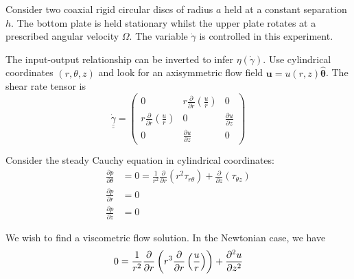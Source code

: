 \documentclass{jknotes}
\newcommand{\dunder}[1]{\underline{\underline{#1}}}
\newcommand{\srate}{\dot{\gamma}}
\begin{document}
Consider two coaxial rigid circular discs of radius $a$ held at a constant separation
$h$. The bottom plate is held stationary whilst the upper plate rotates at a
prescribed angular velocity $\Omega$. The variable $\srate$ is controlled in
this experiment.

\begin{center}
\end{center}

The input-output relationship can be inverted to infer $\eta(\srate)$. Use
cylindrical coordinates $(r, \theta, z)$ and look for an axisymmetric flow
field $\bm{u} = u(r,z) \hat{\bm{\theta}}$. The shear rate tensor is
\begin{equation}
	\dunder{\srate} = \begin{pmatrix} 0 & r\frac{\partial}{\partial r} \left(
		\frac{u}{r}\right) & 0 \\ r\frac{\partial}{\partial r} \left(
	\frac{u}{r}\right) & 0 & \frac{\partial u}{\partial z} \\
0 & \frac{\partial u}{\partial z} & 0 \end{pmatrix}
\end{equation}

Consider the steady Cauchy equation in cylindrical coordinates:
\begin{align}
	\frac{\partial p}{\partial \theta} &= 0 = \frac{1}{r^2} \frac{\partial
		}{\partial r} \left( r^2 \tau_{r\theta}\right) + \frac{\partial}{\partial
z}\left( \tau_{\theta z}\right) \\
\frac{\partial p}{\partial r} &= 0 \\ \frac{\partial p}{\partial z} &= 0
\end{align}


We wish to find a viscometric flow solution. In the Newtonian case, we have
\begin{equation}
	0 = \frac{1}{r^2} \frac{\partial
		}{\partial r} \left( r^3 \frac{\partial}{\partial r} \left(
	\frac{u}{r}\right)\right) + \frac{\partial^2 u}{\partial z^2}\\
\end{equation}
\end{document}
